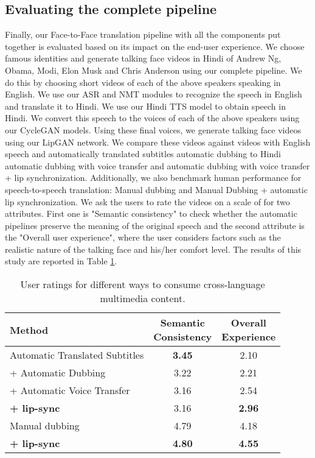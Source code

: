 \documentclass[sigconf]{acmart}
\begin{document}
\subsection{Evaluating the complete pipeline}
Finally, our Face-to-Face translation pipeline with all the components put together is evaluated based on its impact on the end-user experience. We choose  famous identities and generate talking face videos in Hindi of Andrew Ng, Obama, Modi, Elon Musk and Chris Anderson using our complete pipeline. We do this by choosing short videos of each of the above speakers speaking in English. We use our ASR and NMT modules to recognize the speech in English and translate it to Hindi. We use our Hindi TTS model to obtain speech in Hindi. We convert this speech to the voices of each of the above speakers using our CycleGAN models. Using these final voices, we generate talking face videos using our LipGAN network. We compare these videos against videos with  English speech and automatically translated subtitles  automatic dubbing to Hindi  automatic dubbing with voice transfer and  automatic dubbing with voice transfer + lip synchronization. Additionally, we also benchmark human performance for speech-to-speech translation:  Manual dubbing and  Manual Dubbing + automatic lip synchronization. We ask the users to rate the videos on a scale of  for two attributes. First one is "Semantic consistency" to check whether the automatic pipelines preserve the meaning of the original speech and the second attribute is the "Overall user experience", where the user considers factors such as the realistic nature of the talking face and his/her comfort level. The results of this study are reported in Table \ref{tab:overallmos}.

\begin{table}[h]
\begin{tabular}{l c c }
    \toprule
    Method    &  \makecell{Semantic \\ Consistency} & \makecell{Overall \\ Experience}\\
    \midrule
    Automatic Translated Subtitles &  \textbf{3.45}        & 2.10\\
    + Automatic Dubbing         &  3.22                 & 2.21\\
    + Automatic Voice Transfer   &  3.16                 & 2.54\\
    \textbf{+ lip-sync}   &  3.16                 & \textbf{2.96}\\
    \midrule
   Manual dubbing       &  4.79                 & 4.18\\
    \textbf{+ lip-sync}    &  \textbf{4.80}        & \textbf{4.55}\\
    \bottomrule
\end{tabular}
\caption{User ratings for different ways to consume cross-language multimedia content.}
\label{tab:overallmos}
\vspace{-0.6cm}
\end{table}
\end{document}
